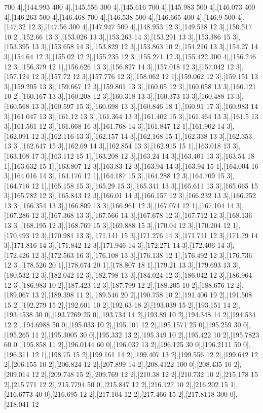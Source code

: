 {700 4],[144.993 400 4],[145.556 300 4],[145.616 700 4],[145.983 500 4],[146.073 400 4],[146.263 500 4],[146.468 700 4],[146.538 500 4],[146.665 400 4],[146.9 500 4],[147.32 12 3],[147.56 300 4],[147.947 500 4],[148.953 12 3],[149.518 12 3],[150.517 10 2],[152.66 13 3],[153.026 13 3],[153.263 14 3],[153.291 13 3],[153.386 15 3],[153.395 13 3],[153.658 14 3],[153.829 12 3],[153.863 10 2],[154.216 13 3],[154.27 14 3],[154.64 12 3],[155.02 12 2],[155.235 12 3],[155.271 12 3],[155.422 300 4],[156.246 12 3],[156.379 12 1],[156.626 13 3],[156.827 14 3],[157.018 12 3],[157.042 12 3],[157.124 12 3],[157.72 12 3],[157.776 12 3],[158.062 12 1],[159.062 12 3],[159.151 13 3],[159.205 13 3],[159.667 12 3],[159.801 13 3],[160.05 12 3],[160.058 13 3],[160.121 10 2],[160.167 13 3],[160.208 12 3],[160.318 13 3],[160.373 13 3],[160.488 13 3],[160.568 13 3],[160.597 15 3],[160.698 13 3],[160.846 18 1],[160.91 17 3],[160.983 14 3],[161.047 13 3],[161.12 13 3],[161.364 13 3],[161.402 15 3],[161.464 13 3],[161.5 13 3],[161.561 12 3],[161.668 16 3],[161.768 14 3],[161.847 12 1],[161.902 14 3],[162.091 12 3],[162.116 13 3],[162.157 14 3],[162.168 15 1],[162.338 13 3],[162.353 13 3],[162.647 15 3],[162.69 14 3],[162.854 13 3],[162.915 15 1],[163.018 13 3],[163.108 17 3],[163.112 15 1],[163.208 12 3],[163.24 14 3],[163.401 13 3],[163.54 18 1],[163.632 15 1],[163.807 12 3],[163.83 12 3],[163.94 14 3],[163.94 15 1],[164.004 16 3],[164.016 14 3],[164.176 12 1],[164.187 15 3],[164.288 12 3],[164.709 15 3],[164.716 12 1],[165.158 15 3],[165.29 15 3],[165.341 13 3],[165.611 13 3],[165.665 15 3],[165.782 12 3],[165.843 12 3],[166.01 14 3],[166.157 12 3],[166.232 13 3],[166.252 13 3],[166.354 13 3],[166.809 13 3],[166.961 12 3],[167.074 12 1],[167.104 14 3],[167.286 12 3],[167.368 13 3],[167.566 14 3],[167.678 12 3],[167.712 12 3],[168.136 13 3],[168.195 12 3],[168.769 15 3],[169.888 15 3],[170.04 12 3],[170.204 12 1],[170.493 12 3],[170.981 13 3],[171.141 15 3],[171.276 14 3],[171.711 12 3],[171.79 14 3],[171.816 14 3],[171.842 12 3],[171.946 14 3],[172.271 14 3],[172.406 14 3],[172.426 12 3],[172.563 16 3],[176.108 13 3],[176.138 12 1],[176.492 12 3],[176.736 12 3],[178.526 20 1],[178.674 20 1],[178.807 18 1],[179.21 13 3],[179.693 13 3],[180.532 12 3],[182.042 12 3],[182.798 13 3],[184.024 12 3],[186.042 12 3],[186.964 12 3],[186.983 10 2],[187.423 12 3],[187.799 12 2],[188.205 10 2],[188.676 12 2],[189.067 13 2],[189.398 11 2],[189.546 20 2],[190.758 10 2],[191.406 19 2],[191.508 15 2],[192.279 15 2],[192.601 10 2],[192.63 18 2],[193.039 15 2],[193.151 14 2],[193.4538 30 0],[193.7269 25 0],[193.734 14 2],[193.89 10 2],[194.348 14 2],[194.534 12 2],[194.6988 50 0],[195.033 10 2],[195.101 12 2],[195.1571 25 0],[195.259 30 0],[195.265 11 2],[195.3005 30 0],[195.332 13 2],[195.349 10 2],[195.422 10 2],[195.7823 60 0],[195.858 11 2],[196.0144 60 0],[196.032 13 2],[196.125 30 0],[196.2111 50 0],[196.311 12 1],[198.75 15 2],[199.161 14 2],[199.407 13 2],[199.556 12 2],[199.642 12 2],[206.155 10 2],[206.824 12 2],[207.899 14 2],[208.4122 100 0],[208.435 10 2],[209.014 12 2],[209.748 15 2],[209.769 12 2],[210.38 12 2],[210.732 10 2],[215.178 15 2],[215.771 12 2],[215.7794 50 0],[215.847 12 2],[216.127 10 2],[216.202 15 1],[216.6773 40 0],[216.695 12 2],[217.104 12 2],[217.466 15 2],[217.8118 300 0],[218.041 12 }
